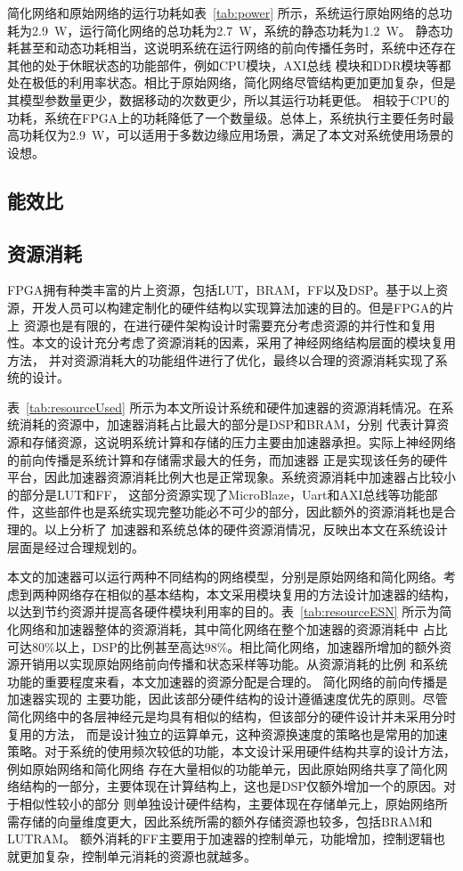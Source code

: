 简化网络和原始网络的运行功耗如表~\ref{tab:power} 所示，系统运行原始网络的总功耗为2.9~W，运行简化网络的总功耗为2.7~W，系统的静态功耗为1.2~W。
静态功耗甚至和动态功耗相当，这说明系统在运行网络的前向传播任务时，系统中还存在其他的处于休眠状态的功能部件，例如CPU模块，AXI总线
模块和DDR模块等都处在极低的利用率状态。相比于原始网络，简化网络尽管结构更加更加复杂，但是其模型参数量更少，数据移动的次数更少，所以其运行功耗更低。
相较于CPU的功耗，系统在FPGA上的功耗降低了一个数量级。总体上，系统执行主要任务时最高功耗仅为2.9~W，可以适用于多数边缘应用场景，满足了本文对系统使用场景的设想。

\subsection{能效比}

\subsection{资源消耗}
FPGA拥有种类丰富的片上资源，包括LUT，BRAM，FF以及DSP。基于以上资源，开发人员可以构建定制化的硬件结构以实现算法加速的目的。但是FPGA的片上
资源也是有限的，在进行硬件架构设计时需要充分考虑资源的并行性和复用性。本文的设计充分考虑了资源消耗的因素，采用了神经网络结构层面的模块复用方法，
并对资源消耗大的功能组件进行了优化，最终以合理的资源消耗实现了系统的设计。



表~\ref{tab:resourceUsed} 所示为本文所设计系统和硬件加速器的资源消耗情况。在系统消耗的资源中，加速器消耗占比最大的部分是DSP和BRAM，分别
代表计算资源和存储资源，这说明系统计算和存储的压力主要由加速器承担。实际上神经网络的前向传播是系统计算和存储需求最大的任务，而加速器
正是实现该任务的硬件平台，因此加速器资源消耗比例大也是正常现象。系统资源消耗中加速器占比较小的部分是LUT和FF，
这部分资源实现了MicroBlaze，Uart和AXI总线等功能部件，这些部件也是系统实现完整功能必不可少的部分，因此额外的资源消耗也是合理的。以上分析了
加速器和系统总体的硬件资源消情况，反映出本文在系统设计层面是经过合理规划的。

本文的加速器可以运行两种不同结构的网络模型，分别是原始网络和简化网络。考虑到两种网络存在相似的基本结构，本文采用模块复用的方法设计加速器的结构，
以达到节约资源并提高各硬件模块利用率的目的。表~\ref{tab:resourceESN} 所示为简化网络和加速器整体的资源消耗，其中简化网络在整个加速器的资源消耗中
占比可达80\%以上，DSP的比例甚至高达98\%。相比简化网络，加速器所增加的额外资源开销用以实现原始网络前向传播和状态采样等功能。从资源消耗的比例
和系统功能的重要程度来看，本文加速器的资源分配是合理的。
简化网络的前向传播是加速器实现的
主要功能，因此该部分硬件结构的设计遵循速度优先的原则。尽管简化网络中的各层神经元是均具有相似的结构，但该部分的硬件设计并未采用分时复用的方法，
而是设计独立的运算单元，这种资源换速度的策略也是常用的加速策略。对于系统的使用频次较低的功能，本文设计采用硬件结构共享的设计方法，例如原始网络和简化网络
存在大量相似的功能单元，因此原始网络共享了简化网络结构的一部分，主要体现在计算结构上，这也是DSP仅额外增加一个的原因。对于相似性较小的部分
则单独设计硬件结构，主要体现在存储单元上，原始网络所需存储的向量维度更大，因此系统所需的额外存储资源也较多，包括BRAM和LUTRAM。
额外消耗的FF主要用于加速器的控制单元，功能增加，控制逻辑也就更加复杂，控制单元消耗的资源也就越多。


